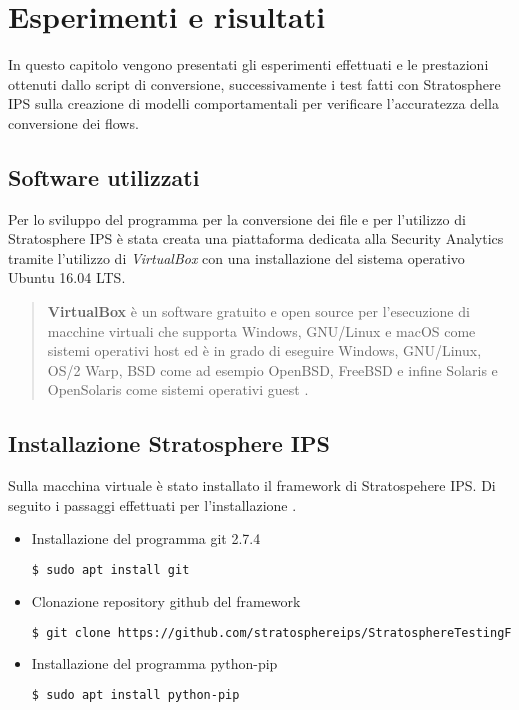\documentclass[../main.tex]{subfiles}
\begin{document}
\chapter{Esperimenti e risultati}

In questo capitolo vengono presentati gli esperimenti effettuati e le prestazioni ottenuti dallo script di conversione, successivamente i test fatti con Stratosphere IPS sulla creazione di modelli comportamentali per verificare l'accuratezza della conversione dei flows.

\section{Software utilizzati}

Per lo sviluppo del programma per la conversione dei file e per l'utilizzo di Stratosphere IPS è stata creata una piattaforma dedicata alla Security Analytics tramite l'utilizzo di \textit{VirtualBox} con una installazione del sistema operativo Ubuntu 16.04 LTS.


\begin{verse}
				\textbf{VirtualBox} è un software gratuito e open source per l'esecuzione di macchine virtuali che supporta Windows, GNU/Linux e macOS come sistemi operativi host ed è in grado di eseguire Windows, GNU/Linux, OS/2 Warp, BSD come ad esempio OpenBSD, FreeBSD e infine Solaris e OpenSolaris come sistemi operativi guest \cite{virtualbox}. 
\end{verse}


\section{Installazione Stratosphere IPS}
Sulla macchina virtuale è stato installato il framework di Stratospehere IPS. Di seguito i passaggi effettuati per l'installazione \cite{stf}.

\begin{itemize}
				\item Installazione del programma git 2.7.4
\begin{lstlisting}[language=bash]
$ sudo apt install git
\end{lstlisting}

				\item Clonazione repository github del framework
\begin{lstlisting}[language=bash]
$ git clone https://github.com/stratosphereips/StratosphereTestingFramework
\end{lstlisting}

				\item Installazione del programma python-pip
\begin{lstlisting}[language=bash]
$ sudo apt install python-pip
\end{lstlisting}
\end{itemize}
				
\end{document}
